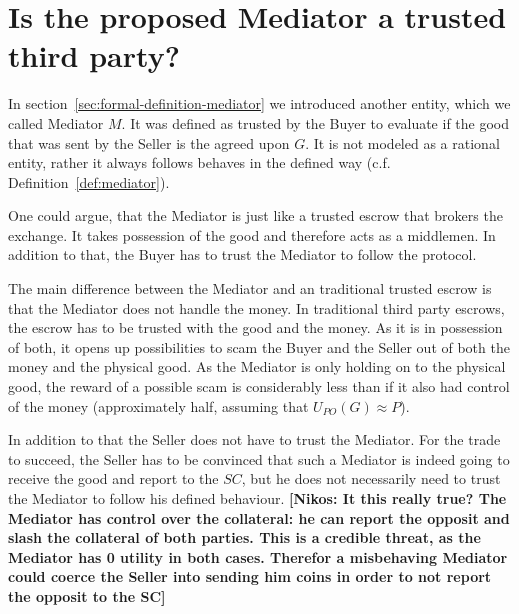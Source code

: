 \documentclass{cacthesis}
\newcommand{\authnote}[3]{{ \footnotesize \textbf{#1[#2: #3]~}}}
\newcommand{\niknote}[1]{\authnote{\color{red}}{Nikos}{#1}}
\begin{document}
\section{Is the proposed Mediator a trusted third party?}

In section~\ref{sec:formal-definition-mediator} we introduced another entity, which we called Mediator $M$. It was defined as trusted by the Buyer to evaluate if the good that was sent by the Seller is the agreed upon $G$. It is not modeled as a rational entity, rather it always follows behaves in the defined way (c.f. Definition~\ref{def:mediator}).\newline

One could argue, that the Mediator is just like a trusted escrow that brokers the exchange. It takes possession of the good and therefore acts as a middlemen. In addition to that, the Buyer has to trust the Mediator to follow the protocol.\newline

The main difference between the Mediator and an traditional trusted escrow is that the Mediator does not handle the money. In traditional third party escrows, the escrow has to be trusted with the good and the money. As it is in possession of both, it opens up possibilities to scam the Buyer and the Seller out of both the money and the physical good.
As the Mediator is only holding on to the physical good, the reward of a possible scam is considerably less than if it also had control of the money (approximately half, assuming that $U_{PO}(G) \approx P$).\newline

In addition to that the Seller does not have to trust the Mediator. For the trade to succeed, the Seller has to be convinced that such a Mediator is indeed going to receive the good and report to the $SC$, but he does not necessarily need to trust the Mediator to follow his defined behaviour. \niknote{It this really true? The Mediator has control over the collateral: he can report the opposit and slash the collateral of both parties. This is a credible threat, as the Mediator has 0 utility in both cases. Therefor a misbehaving Mediator could coerce the Seller into sending him coins in order to not report the opposit to the SC}\newline
\end{document}
